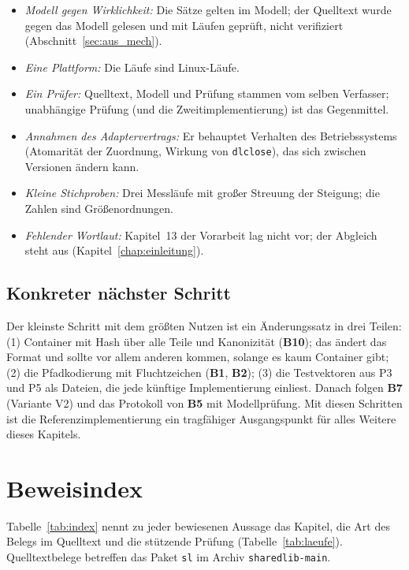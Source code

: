 \documentclass[a4paper,12pt,twoside]{report}
\DeclareRobustCommand{\_}{\ifmmode\mbox{\textunderscore}\else\textunderscore\allowbreak{}\fi}
\theoremstyle{definition}
\newcommand{\Bf}[1]{\textbf{B#1}}
\begin{document}
\begin{itemize}
	\item \emph{Modell gegen Wirklichkeit:} Die Sätze gelten im Modell; der Quelltext wurde gegen das Modell gelesen und mit Läufen geprüft, nicht verifiziert (Abschnitt~\ref{sec:aus_mech}).
	\item \emph{Eine Plattform:} Die Läufe sind Linux-Läufe.
	\item \emph{Ein Prüfer:} Quelltext, Modell und Prüfung stammen vom selben Verfasser; unabhängige Prüfung (und die Zweitimplementierung) ist das Gegenmittel.
	\item \emph{Annahmen des Adaptervertrags:} Er behauptet Verhalten des Betriebssystems (Atomarität der Zuordnung, Wirkung von \texttt{dlclose}), das sich zwischen Versionen ändern kann.
	\item \emph{Kleine Stichproben:} Drei Messläufe mit großer Streuung der Steigung; die Zahlen sind Größenordnungen.
	\item \emph{Fehlender Wortlaut:} Kapitel~13 der Vorarbeit lag nicht vor; der Abgleich steht aus (Kapitel~\ref{chap:einleitung}).
\end{itemize}

\section{Konkreter nächster Schritt}

Der kleinste Schritt mit dem größten Nutzen ist ein Änderungssatz in drei Teilen: (1) Container mit Hash über alle Teile und Kanonizität (\Bf{10}); das ändert das Format und sollte vor allem anderen kommen, solange es kaum Container gibt; (2) die Pfadkodierung mit Fluchtzeichen (\Bf{1}, \Bf{2}); (3) die Testvektoren aus P3 und P5 als Dateien, die jede künftige Implementierung einliest. Danach folgen \Bf{7} (Variante V2) und das Protokoll von \Bf{5} mit Modellprüfung. Mit diesen Schritten ist die Referenzimplementierung ein tragfähiger Ausgangspunkt für alles Weitere dieses Kapitels.


\appendix
\chapter{Beweisindex}
\label{app:index}

Tabelle~\ref{tab:index} nennt zu jeder bewiesenen Aussage das Kapitel, die Art des Belegs im Quelltext und die stützende Prüfung (Tabelle~\ref{tab:laeufe}). Quelltextbelege betreffen das Paket \texttt{sl} im Archiv \texttt{sharedlib-main}.
\end{document}
